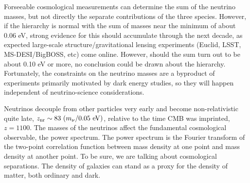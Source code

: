 


Forseeable  cosmological measurements can determine the sum of the 
neutrino masses, but not directly the separate contributions of the three species. However, if the hierarchy is normal with the sum of 
masses near the minimum of about 0.06 eV,
strong evidence for this should accumulate through the next decade, 
as expected large-scale structure/gravitational lensing experiments 
(Euclid, LSST, MS-DESI/BigBOSS, etc) come online. However, should the sum turn out to be about 0.10 eV or more, no conclusion could be drawn about the hierarchy.
Fortunately, the constraints on the neutrino masses are a byproduct of
experiments primarily motivated by dark energy studies, so they
will happen independent of neutrino-science considerations.

Neutrinos decouple from other particles very early and become
non-relativistic quite late, $z_{\rm nr}\sim 83~(m_\nu / 0.05~ {\rm
eV})$, relative to the time CMB was imprinted, $z=1100$.  The masses
of the neutrinos affect the fundamental cosmological observable, the
power spectrum.  The power spectrum is the Fourier transform of the
two-point correlation function between mass density at one point and
mass density at another point.  To be sure, we are talking about
cosmological separations.  The density of galaxies can stand as a
proxy for the density of matter, both ordinary and dark.   



